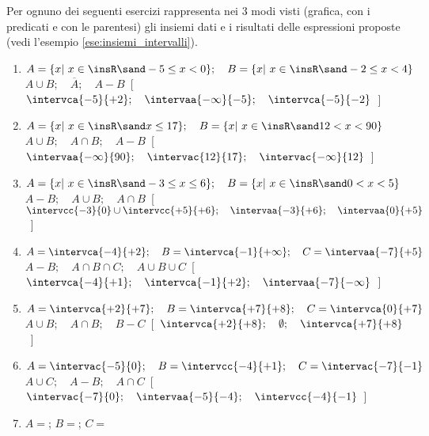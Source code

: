 \begin{esercizio}
\label{ese:}
Per ognuno dei seguenti esercizi rappresenta nei 3 modi visti 
(grafica, con i predicati e con le parentesi) 
gli insiemi dati e i risultati delle espressioni proposte
(vedi l'esempio \ref{ese:insiemi_intervalli}).
\begin{enumerate}[label=\alph*)]
\item \(A=\{x|~x \in \insR \sand -5 \le x < 0\}; \quad 
        B=\{x|~x \in \insR \sand -2 \le x < 4\}\)\\
        \(A \cup B; \quad \overline{A}; \quad A-B\)\
\hfill [~\(\intervca{-5}{+2}; \quad \intervaa{-\infty}{-5}; \quad
\intervca{-5}{-2}\)~]
\item \(A=\{x|~x \in \insR \sand  x \le 17\}; \quad 
        B=\{x|~x \in \insR \sand  12 < x < 90\}\)\\
        \(A \cup B; \quad A \cap B; \quad A-B\)\
\hfill [~\(\intervaa{-\infty}{90}; \quad \intervac{12}{17}; \quad
\intervac{-\infty}{12}\)~]
\item \(A=\{x|~x \in \insR \sand -3 \le x \le 6\}; \quad 
        B=\{x|~x \in \insR \sand  0 < x < 5\}\)\\
        \(A-B; \quad A \cup B; \quad A \cap B\)\
\hfill [~\(\intervcc{-3}{0} \cup \intervcc{+5}{+6}; \quad 
\intervaa{-3}{+6}; \quad
\intervaa{0}{+5}\)~]
\item \(A=\intervca{-4}{+2}; \quad 
        B=\intervca{-1}{+\infty}; \quad 
        C=\intervaa{-7}{+5}\)\\
        \(A-B; \quad A \cap B \cap C; \quad A \cup B \cup C\)\
\hfill [~\(\intervca{-4}{+1}; \quad \intervca{-1}{+2}; \quad
\intervaa{-7}{-\infty}\)~]
\item \(A=\intervca{+2}{+7}; \quad 
        B=\intervca{+7}{+8}; \quad 
        C=\intervca{0}{+7}\)\\
        \(A \cup B; \quad A \cap B; \quad B-C\)\
\hfill [~\(\intervca{+2}{+8}; \quad \emptyset; \quad
\intervca{+7}{+8}\)~]
\item \(A=\intervac{-5}{0}; \quad 
        B=\intervcc{-4}{+1}; \quad 
        C=\intervac{-7}{-1}\)\\
        \(A \cup C; \quad A-B; \quad A \cap C\)\
\hfill [~\(\intervac{-7}{0}; \quad \intervaa{-5}{-4}; \quad
\intervcc{-4}{-1}\)~]
\item 
\(A=\); 
\quad
\(B=\); 
\quad
\(C=\)\\

\end{enumerate}
\end{esercizio}

